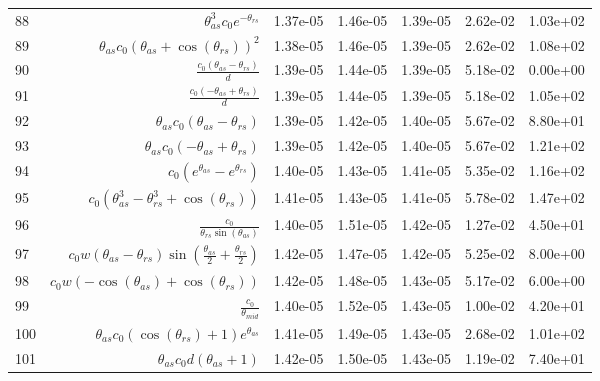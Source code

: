 \begin{tabularx}{\textwidth}{lRRRRRl}
88  &  $ \theta_{as}^{3} c_{0} e^{- \theta_{rs}} $  &  1.37e-05  &  1.46e-05  &  1.39e-05  &  2.62e-02  &  1.03e+02  \\ 
89  &  $ \theta_{as} c_{0} \left(\theta_{as} + \cos{\left(\theta_{rs} \right)}\right)^{2} $  &  1.38e-05  &  1.46e-05  &  1.39e-05  &  2.62e-02  &  1.08e+02  \\ 
90  &  $ \displaystyle\frac{c_{0} \left(\theta_{as} - \theta_{rs}\right)}{d} $  &  1.39e-05  &  1.44e-05  &  1.39e-05  &  5.18e-02  &  0.00e+00  \\ 
91  &  $ \displaystyle\frac{c_{0} \left(- \theta_{as} + \theta_{rs}\right)}{d} $  &  1.39e-05  &  1.44e-05  &  1.39e-05  &  5.18e-02  &  1.05e+02  \\ 
92  &  $ \theta_{as} c_{0} \left(\theta_{as} - \theta_{rs}\right) $  &  1.39e-05  &  1.42e-05  &  1.40e-05  &  5.67e-02  &  8.80e+01  \\ 
93  &  $ \theta_{as} c_{0} \left(- \theta_{as} + \theta_{rs}\right) $  &  1.39e-05  &  1.42e-05  &  1.40e-05  &  5.67e-02  &  1.21e+02  \\ 
94  &  $ c_{0} \left(e^{\theta_{as}} - e^{\theta_{rs}}\right) $  &  1.40e-05  &  1.43e-05  &  1.41e-05  &  5.35e-02  &  1.16e+02  \\ 
95  &  $ c_{0} \left(\theta_{as}^{3} - \theta_{rs}^{3} + \cos{\left(\theta_{rs} \right)}\right) $  &  1.41e-05  &  1.43e-05  &  1.41e-05  &  5.78e-02  &  1.47e+02  \\ 
96  &  $ \displaystyle\frac{c_{0}}{\theta_{rs} \sin{\left(\theta_{as} \right)}} $  &  1.40e-05  &  1.51e-05  &  1.42e-05  &  1.27e-02  &  4.50e+01  \\ 
97  &  $ c_{0} w \left(\theta_{as} - \theta_{rs}\right) \sin{\left(\displaystyle\frac{\theta_{as}}{2} + \displaystyle\frac{\theta_{rs}}{2} \right)} $  &  1.42e-05  &  1.47e-05  &  1.42e-05  &  5.25e-02  &  8.00e+00  \\ 
98  &  $ c_{0} w \left(- \cos{\left(\theta_{as} \right)} + \cos{\left(\theta_{rs} \right)}\right) $  &  1.42e-05  &  1.48e-05  &  1.43e-05  &  5.17e-02  &  6.00e+00  \\ 
99  &  $ \displaystyle\frac{c_{0}}{\theta_{mid}} $  &  1.40e-05  &  1.52e-05  &  1.43e-05  &  1.00e-02  &  4.20e+01  \\ 
100  &  $ \theta_{as} c_{0} \left(\cos{\left(\theta_{rs} \right)} + 1\right) e^{\theta_{as}} $  &  1.41e-05  &  1.49e-05  &  1.43e-05  &  2.68e-02  &  1.01e+02  \\ 
101  &  $ \theta_{as} c_{0} d \left(\theta_{as} + 1\right) $  &  1.42e-05  &  1.50e-05  &  1.43e-05  &  1.19e-02  &  7.40e+01  \\ 

\end{tabularx}
